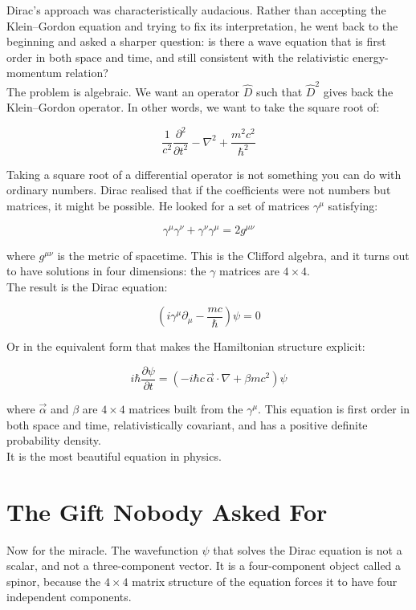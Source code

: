 \documentclass[krantz1,ChapterTOCs]{krantz}
\begin{document}
Dirac's approach was characteristically audacious. Rather than
accepting the Klein--Gordon equation and trying to fix its
interpretation, he went back to the beginning and asked a sharper
question: is there a wave equation that is first order in both space
and time, and still consistent with the relativistic energy-momentum
relation?\\

The problem is algebraic. We want an operator $\hat{D}$ such that
$\hat{D}^2$ gives back the Klein--Gordon operator. In other words,
we want to take the square root of:

$$\frac{1}{c^2}\frac{\partial^2}{\partial t^2} -
\nabla^2 + \frac{m^2c^2}{\hbar^2}$$

Taking a square root of a differential operator is not something
you can do with ordinary numbers. Dirac realised that if the
coefficients were not numbers but matrices, it might be possible.
He looked for a set of matrices $\gamma^\mu$ satisfying:

$$\gamma^\mu\gamma^\nu + \gamma^\nu\gamma^\mu = 2g^{\mu\nu}$$

where $g^{\mu\nu}$ is the metric of spacetime. This is the Clifford
algebra, and it turns out to have solutions in four dimensions: the
$\gamma$ matrices are $4 \times 4$.\\

The result is the Dirac equation:

$$\boxed{\left(i\gamma^\mu\partial_\mu - \frac{mc}{\hbar}\right)\psi = 0}$$

Or in the equivalent form that makes the Hamiltonian structure
explicit:

$$i\hbar\frac{\partial\psi}{\partial t} =
\left(-i\hbar c\,\vec{\alpha}\cdot\nabla + \beta mc^2\right)\psi$$

where $\vec{\alpha}$ and $\beta$ are $4 \times 4$ matrices built
from the $\gamma^\mu$. This equation is first order in both space
and time, relativistically covariant, and has a positive definite
probability density.\\

It is the most beautiful equation in physics.\\

\section*{The Gift Nobody Asked For}

Now for the miracle. The wavefunction $\psi$ that solves the Dirac
equation is not a scalar, and not a three-component vector. It is a
four-component object called a spinor, because the $4 \times 4$
matrix structure of the equation forces it to have four independent
components.\\
\end{document}
